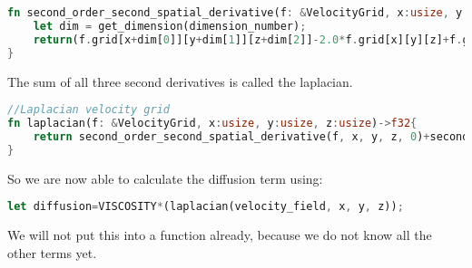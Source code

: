\documentclass{article}
\begin{document}
\begin{lstlisting}[language=Rust, style=boxed, breaklines=true]
fn second_order_second_spatial_derivative(f: &VelocityGrid, x:usize, y:usize, z:usize, dimension_number:usize) -> f32{
    let dim = get_dimension(dimension_number);
    return(f.grid[x+dim[0]][y+dim[1]][z+dim[2]]-2.0*f.grid[x][y][z]+f.grid[x-dim[0]][y-dim[1]][z-dim[2]])/(GRIDELEMENTSCALE*GRIDELEMENTSCALE);
}
\end{lstlisting}
The sum of all three second derivatives is called the laplacian. \cite{MAC}
\begin{lstlisting}[language=Rust, style=boxed, breaklines=true]
//Laplacian velocity grid
fn laplacian(f: &VelocityGrid, x:usize, y:usize, z:usize)->f32{
    return second_order_second_spatial_derivative(f, x, y, z, 0)+second_order_second_spatial_derivative(f, x, y, z, 1)+second_order_second_spatial_derivative(f, x, y, z, 2);
}
\end{lstlisting}
So we are now able to calculate the diffusion term using:
\begin{lstlisting}[language=Rust, style=boxed, breaklines=true]
let diffusion=VISCOSITY*(laplacian(velocity_field, x, y, z));
\end{lstlisting}
We will not put this into a function already, because we do not know all the other terms yet. 
\newpage
\end{document}
